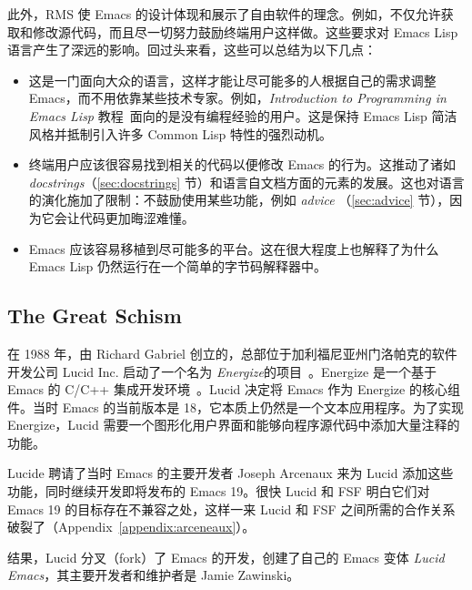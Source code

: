 \documentclass[format=acmsmall,screen]{acmart}
\begin{document}
此外，RMS 使 Emacs 的设计体现和展示了自由软件的理念。例如，不仅允许获取和修改源代码，而且尽一切努力鼓励终端用户这样做。这些要求对 Emacs Lisp 语言产生了深远的影响。回过头来看，这些可以总结为以下几点：

\begin{itemize}

\item 这是一门面向大众的语言，这样才能让尽可能多的人根据自己的需求调整 Emacs，而不用依靠某些技术专家。例如，\emph{Introduction to Programming in Emacs Lisp} 教程~\citep{ElispIntro}面向的是没有编程经验的用户。这是保持 Emacs Lisp 简洁风格并抵制引入许多 Common Lisp 特性的强烈动机。

\item 终端用户应该很容易找到相关的代码以便修改 Emacs 的行为。这推动了诸如 \emph{docstrings}（\ref{sec:docstrings} 节）和语言自文档方面的元素的发展。这也对语言的演化施加了限制：不鼓励使用某些功能，例如 \emph{advice} （\ref{sec:advice} 节），因为它会让代码更加晦涩难懂。

\item Emacs 应该容易移植到尽可能多的平台。这在很大程度上也解释了为什么 Emacs Lisp 仍然运行在一个简单的字节码解释器中。

\end{itemize}

\subsection{The Great Schism}
\label{sec:schism}
\label{sec:energize}

在 1988 年，由 Richard Gabriel 创立的，总部位于加利福尼亚州门洛帕克的软件开发公司 Lucid Inc. 启动了一个名为 \emph{Energize}的项目~\cite{GabrielEtAl1990,Gabriel-personal}。Energize 是一个基于 Emacs 的 C/C++ 集成开发环境~\cite{GabrielLetter}。Lucid 决定将 Emacs 作为 Energize 的核心组件。当时 Emacs 的当前版本是 18，它本质上仍然是一个文本应用程序。为了实现 Energize，Lucid 需要一个图形化用户界面和能够向程序源代码中添加大量注释的功能。

Lucide 聘请了当时 Emacs 的主要开发者 Joseph Arcenaux 来为 Lucid 添加这些功能，同时继续开发即将发布的 Emacs 19。很快 Lucid 和 FSF 明白它们对 Emacs 19 的目标存在不兼容之处，这样一来 Lucid 和 FSF 之间所需的合作关系破裂了（Appendix~\ref{appendix:arceneaux}）。

结果，Lucid 分叉（fork）了 Emacs 的开发，创建了自己的 Emacs 变体 \emph{Lucid Emacs}，其主要开发者和维护者是 Jamie Zawinski。
\end{document}

